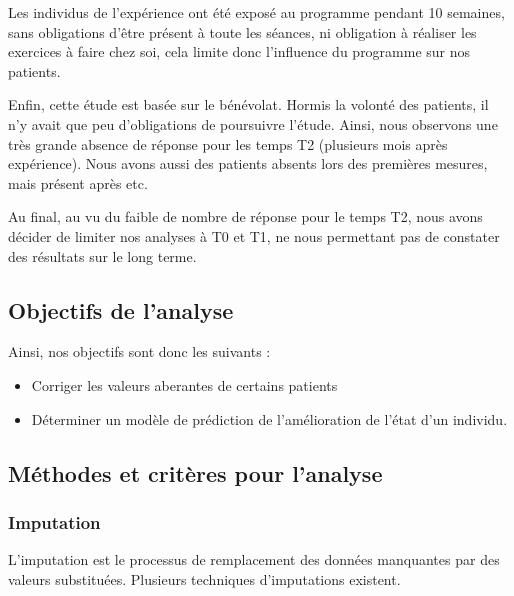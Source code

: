 \documentclass[]{article}
\providecommand{\tightlist}{%
  \setlength{\itemsep}{0pt}\setlength{\parskip}{0pt}}
\begin{document}
Les individus de l'expérience ont été exposé au programme pendant 10
semaines, sans obligations d'être présent à toute les séances, ni
obligation à réaliser les exercices à faire chez soi, cela limite donc
l'influence du programme sur nos patients.

Enfin, cette étude est basée sur le bénévolat. Hormis la volonté des
patients, il n'y avait que peu d'obligations de poursuivre l'étude.
Ainsi, nous observons une très grande absence de réponse pour les temps
T2 (plusieurs mois après expérience). Nous avons aussi des patients
absents lors des premières mesures, mais présent après etc.

Au final, au vu du faible de nombre de réponse pour le temps T2, nous
avons décider de limiter nos analyses à T0 et T1, ne nous permettant pas
de constater des résultats sur le long terme.

\hypertarget{objectifs-de-lanalyse}{%
\subsection{Objectifs de l'analyse}\label{objectifs-de-lanalyse}}

Ainsi, nos objectifs sont donc les suivants :

\begin{itemize}
\tightlist
\item
  Corriger les valeurs aberantes de certains patients
\item
  Déterminer un modèle de prédiction de l'amélioration de l'état d'un
  individu.
\end{itemize}

\hypertarget{methodes-et-criteres-pour-lanalyse}{%
\subsection{Méthodes et critères pour
l'analyse}\label{methodes-et-criteres-pour-lanalyse}}

\hypertarget{imputation}{%
\subsubsection{Imputation}\label{imputation}}

L'imputation est le processus de remplacement des données manquantes par
des valeurs substituées. Plusieurs techniques d'imputations existent.
\end{document}
